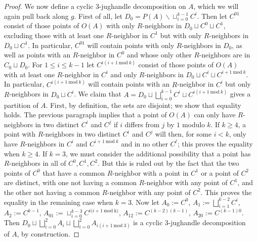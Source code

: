 \documentclass{amsart}
\theoremstyle{definition}
\theoremstyle{remark}
\numberwithin{equation}{section}
\begin{document}
\begin{proof}
We now define a cyclic $3$-jughandle decomposition on $A$, which we will again pull back along $g$. First of all, let $D_{0} = P(A) \backslash \sqcup^{k-1}_{i=0} C^{i}$. Then let $C^{01}$ consist of those points of $O(A)$ with only $R$-neighbors in $D_{0} \sqcup C^{0} \sqcup C^{1}$, excluding those with at least one $R$-neighbor in $C^{1}$ but with only $R$-neighbors in $D_{0} \sqcup C^{1}$. In particular, $C^{01}$ will contain points with only $R$-neighbors in $D_{0}$, as well as points with an $R$-neighbor in $C^{0}$ and whose only other $R$-neighbors are in $C_{0} \sqcup D_{0}$. For $1 \leq i \leq k-1$ let $C^{i(i +1 \mathrm{\: mod \:} k)}$ consist of those points of $O(A)$ with at least one $R$-neighbor in $C^{i}$ and only $R$-neighbors in $D_{0} \sqcup C^{i} \sqcup C^{i+1 \mathrm{\:mod \: }k}$. In particular, $C^{i(i +1 \mathrm{\: mod \:} k)}$ will contain points with an $R$-neighbor in $C^{i}$ but only $R$-neighbors in $D_{0} \sqcup C^{i} $. We claim that $A=  D_{0} \sqcup \bigsqcup^{k-1}_{i=0} C^{i} \sqcup C^{i(i +1 \mathrm{\: mod \:} k)} $ gives a partition of $A$. First, by definition, the sets are disjoint; we show that equality holds.  The previous paragraph implies that a point of $O(A)$ can only have $R$-neighbors in two distinct $C^{i}$ and $C^{j}$ if $i$ differs from $j$ by $1$ modulo $k$. If $k \geq 4$, a point with $R$-neighbors in two distinct $C^{i}$ and $C^{j}$ will then, for some $i < k$, only have $R$-neighbors in $C^{i}$ and $C^{i+1  \mathrm{\: mod\: } k }$ and in no other $C^{\ell}$; this proves the equality when $k \geq 4$.  If $k = 3$, we must consider the additional possibility that a point has $R$-neighbors in all of $C^{0}, C^{1}, C^{2}$. But this is ruled out by the fact that the two points of $C^0$ that have a common $R$-neighbor with a point in $C^{1}$ or a point of $C^{2}$ are distinct, with one not having a common $R$-neighbor with any point of $C^{1}$, and the other not having a common $R$-neighbor with any point of $C^{2}$.  This proves the equality in the remaining case when $k = 3$. Now let $A_{0}:=C^{0}$, $A_{1}:= \bigsqcup^{k-2}_{i=1} C^{i}$, $A_{2}:= C^{k-1}$, $A_{01}:=\sqcup^{k-3}_{i=0} C^{i(i+1 \mathrm{\:mod \: k)}}$, $A_{12}:=C^{(k-2)(k-1)}$, $A_{20} := C^{(k-1)0}$. Then  $D_{0} \sqcup \bigsqcup^{2}_{i=0}A_{i} \sqcup  \bigsqcup^{2}_{i=0}A_{i(i +1 \mathrm{\:mod \:} 3)}$ is a cyclic $3$-jughandle decomposition of $A$, by construction.




\end{proof}
\end{document}
